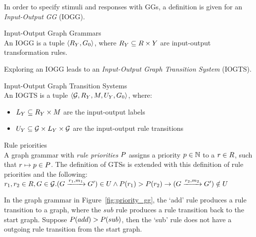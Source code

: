 In order to specify stimuli and responses with GGs, a definition is given for an \textit{Input-Output GG} (IOGG).
\vspace{10px}
\begin{definition} Input-Output Graph Grammars \\
An IOGG is a tuple $\langle R_{Y}, G_0\rangle$, where $R_{Y} \subseteq R \times Y$ are input-output transformation rules.
\end{definition}
\vspace{10px}

Exploring an IOGG leads to an \textit{Input-Output Graph Transition System} (IOGTS).
\vspace{10px}
\begin{definition} Input-Output Graph Transition Systems \\
An IOGTS is a tuple  $\langle \mathcal{G}, R_{Y}, M, U_{Y}, G_0\rangle$, where:
\begin{itemize}
\item {}$L_{Y} \subseteq R_{Y} \times M$ are the input-output labels
\item {}$U_{Y} \subseteq \mathcal{G} \times L_{Y} \times \mathcal{G}$ are the input-output rule transitions
\end{itemize}
\end{definition}

\vspace{10px}
\begin{definition} Rule priorities \\
A graph grammar with \textit{rule priorities} $P$ assigns a priority $p\in\mathbb{N}$ to a $r \in R$, such that ${r \mapsto p}\in P$. The definition of GTSs is extended with this definition of rule priorities and the following:\\
\vspace{5px}
$r_1, r_2\in R, G \in \mathcal{G} . (G \xrightarrow{r_1, m_1}G') \in U \land P(r_1) > P(r_2) \rightarrow (G \xrightarrow{r_2, m_2}G') \notin U$\\
\end{definition}
\vspace{10px}
In the graph grammar in Figure~\ref{fig:priority_gg}, the `add' rule produces a rule transition to a graph, where the $sub$ rule produces a rule transition back to the start graph. Suppose $P(add) > P(sub)$, then the `sub' rule does not have a outgoing rule transition from the start graph.

